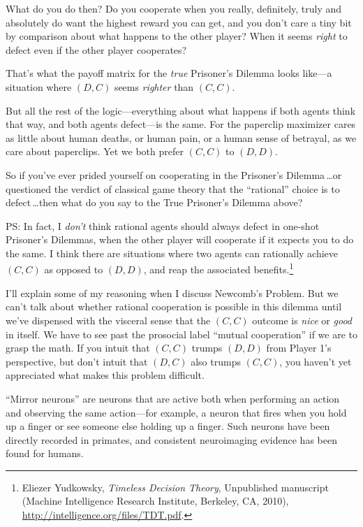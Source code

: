  What do you do then? Do you cooperate when you really, definitely,
truly and absolutely do want the highest reward you can get, and you
don't care a tiny bit by comparison about what happens
to the other player? When it seems \textit{right} to defect even if the
other player cooperates?


 That's what the payoff matrix for the
\textit{true} Prisoner's Dilemma looks like---a
situation where $(D,C)$ seems \textit{righter} than $(C,C)$.


 But all the rest of the logic---everything about what happens if
both agents think that way, and both agents defect---is the same. For
the paperclip maximizer cares as little about human deaths, or human
pain, or a human sense of betrayal, as we care about paperclips. Yet we
both prefer $(C,C)$ to $(D,D)$.


 So if you've ever prided yourself on cooperating
in the Prisoner's Dilemma\,\ldots or questioned the
verdict of classical game theory that the
``rational'' choice is to defect\,\ldots then what do you say to the True Prisoner's
Dilemma above?

{
 PS: In fact, I \textit{don't} think rational
agents should always defect in one-shot Prisoner's
Dilemmas, when the other player will cooperate if it expects you to do
the same. I think there are situations where two agents can rationally
achieve $(C,C)$ as opposed to $(D,D)$, and reap the associated
benefits.\footnote{Eliezer Yudkowsky, \textit{Timeless Decision Theory},
Unpublished manuscript (Machine Intelligence Research Institute,
Berkeley, CA, 2010), \url{http://intelligence.org/files/TDT.pdf}.}}


 I'll explain some of my reasoning when I discuss
Newcomb's Problem. But we can't talk
about whether rational cooperation is possible in this dilemma until
we've dispensed with the visceral sense that the $(C,C)$
outcome is \textit{nice} or \textit{good} in itself. We have to see
past the prosocial label ``mutual
cooperation'' if we are to grasp the math. If you
intuit that $(C,C)$ trumps $(D,D)$ from Player 1's
perspective, but don't intuit that $(D,C)$ also trumps
$(C,C)$, you haven't yet appreciated what makes this
problem difficult.

\myendsectiontext



 ``Mirror neurons'' are neurons
that are active both when performing an action and observing the same
action---for example, a neuron that fires when you hold up a finger or
see someone else holding up a finger. Such neurons have been directly
recorded in primates, and consistent neuroimaging evidence has been
found for humans. 


